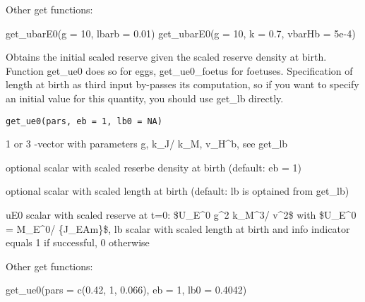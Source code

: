 \documentclass[a4paper]{book}
\begin{document}
%
\begin{SeeAlso}\relax
Other get functions: 
\end{SeeAlso}
%
\begin{Examples}
\begin{ExampleCode}
get_ubarE0(g = 10, lbarb = 0.01)
get_ubarE0(g = 10, k = 0.7, vbarHb = 5e-4)
\end{ExampleCode}
\end{Examples}
%
\begin{Description}\relax
Obtains the initial scaled reserve given the scaled reserve density at birth.
Function get\_ue0 does so for eggs, get\_ue0\_foetus for foetuses.
Specification of length at birth as third input by-passes its computation,
so if you want to specify an initial value for this quantity, you should use get\_lb directly.
\end{Description}
%
\begin{Usage}
\begin{verbatim}
get_ue0(pars, eb = 1, lb0 = NA)
\end{verbatim}
\end{Usage}
%
\begin{Arguments}
\begin{ldescription}
\item[\code{pars}] 1 or 3 -vector with parameters g, k\_J/ k\_M, v\_H\textasciicircum{}b, see get\_lb

\item[\code{eb}] optional scalar with scaled reserbe density at birth (default: eb = 1)

\item[\code{lb0}] optional scalar with scaled length at birth (default: lb is optained from get\_lb)
\end{ldescription}
\end{Arguments}
%
\begin{Value}
uE0 scalar with scaled reserve at t=0: \$U\_E\textasciicircum{}0 g\textasciicircum{}2 k\_M\textasciicircum{}3/ v\textasciicircum{}2\$ with \$U\_E\textasciicircum{}0 = M\_E\textasciicircum{}0/ \{J\_EAm\}\$, lb scalar with scaled length at birth and info indicator equals 1 if successful, 0 otherwise
\end{Value}
%
\begin{SeeAlso}\relax
Other get functions: 
\end{SeeAlso}
%
\begin{Examples}
\begin{ExampleCode}
get_ue0(pars = c(0.42, 1, 0.066), eb = 1, lb0 = 0.4042)
\end{ExampleCode}
\end{Examples}
\end{document}
